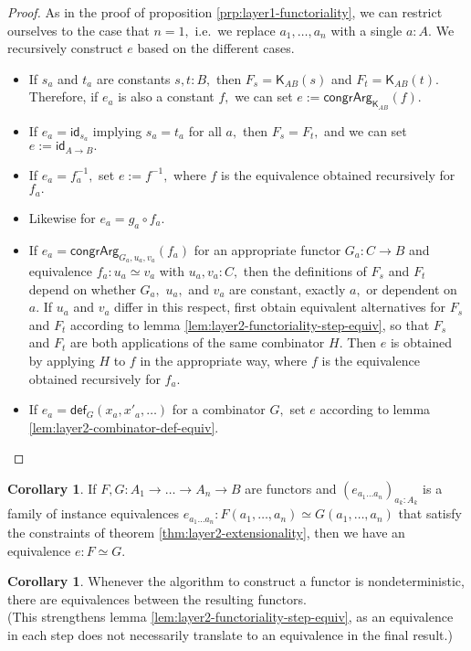 \documentclass[a4paper]{article}
\theoremstyle{definition}
\newtheorem{corollary}[definition]{Corollary}
\theoremstyle{remark}
\renewcommand{\equiv}{\simeq}
\newcommand{\nm}{\mathsf}
\newcommand{\id}{\nm{id}}
\newcommand{\congrArg}{\nm{congrArg}}
\newcommand{\fndef}[1]{\nm{def}_{#1}}
\newcommand{\combinator}{\nm}
\newcommand{\constFun}{\combinator{K}}
\begin{document}
\begin{proof}
  As in the proof of proposition \ref{prp:layer1-functoriality}, we can restrict ourselves to the
  case that $n = 1,$ i.e.\ we replace $a_1,\dots,a_n$ with a single $a : A.$
  We recursively construct $e$ based on the different cases.
  \begin{itemize}
    \item If $s_a$ and $t_a$ are constants $s,t : B,$ then $F_s = \constFun_{AB}(s)$ and
    $F_t = \constFun_{AB}(t).$ Therefore, if $e_a$ is also a constant $f,$ we can set
    $e := \congrArg_{\constFun_{AB}}(f).$
    \item If $e_a = \id_{s_a}$ implying $s_a = t_a$ for all $a,$ then $F_s = F_t,$ and we
    can set $e := \id_{A{\to}B}.$
    \item If $e_a = f_a^{-1},$ set $e := f^{-1},$ where $f$ is the equivalence obtained
    recursively for $f_a.$
    \item Likewise for $e_a = g_a \circ f_a.$
    \item If $e_a = \congrArg_{G_a,u_a,v_a}(f_a)$ for an appropriate functor
    $G_a : C \to B$ and equivalence $f_a : u_a \equiv v_a$ with $u_a,v_a : C,$ then the
    definitions of $F_s$ and $F_t$ depend on whether $G_a,$ $u_a,$ and $v_a$ are constant,
    exactly $a,$ or dependent on $a.$ If $u_a$ and $v_a$ differ in this respect, first
    obtain equivalent alternatives for $F_s$ and $F_t$ according to lemma
    \ref{lem:layer2-functoriality-step-equiv}, so that $F_s$ and $F_t$ are both applications of
    the same combinator $H.$ Then $e$ is obtained by applying $H$ to $f$ in the
    appropriate way, where $f$ is the equivalence obtained recursively for $f_a.$
    \item If $e_a = \fndef{G}(x_a,x'_a,\dots)$ for a combinator $G,$ set $e$ according
    to lemma \ref{lem:layer2-combinator-def-equiv}.
    \qedhere
  \end{itemize}
\end{proof}

\begin{corollary}
  \label{cor:layer2-extensionality}
  If $F,G : A_1 \to \dots \to A_n \to B$ are functors and
  $(e_{a_1 \dots a_n})_{a_k : A_k}$ is a family of instance equivalences
  $e_{a_1 \dots a_n} : F(a_1,\dots,a_n) \equiv G(a_1,\dots,a_n)$ that satisfy the
  constraints of theorem \ref{thm:layer2-extensionality}, then we have an equivalence
  $e : F \equiv G.$
\end{corollary}

\begin{corollary}
  Whenever the algorithm to construct a functor is nondeterministic, there are equivalences
  between the resulting functors.\\
  (This strengthens lemma \ref{lem:layer2-functoriality-step-equiv}, as an equivalence in
  each step does not necessarily translate to an equivalence in the final result.)
\end{corollary}
\end{document}
